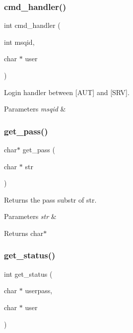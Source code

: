 \subsubsection{cmd\+\_\+handler()}
{\footnotesize\ttfamily int cmd\+\_\+handler (\begin{DoxyParamCaption}\item[{int}]{msqid,  }\item[{char $\ast$}]{user }\end{DoxyParamCaption})}



Login handler between [A\+UT] and [S\+RV]. 


\begin{DoxyParams}{Parameters}
{\em msqid} & \\
\hline
\end{DoxyParams}
\mbox{\label{auth_8c_a2e12b8307c78eca77ba679c218546ea9}} 
\subsubsection{get\+\_\+pass()}
{\footnotesize\ttfamily char$\ast$ get\+\_\+pass (\begin{DoxyParamCaption}\item[{char $\ast$}]{str }\end{DoxyParamCaption})}



Returns the pass substr of str. 


\begin{DoxyParams}{Parameters}
{\em str} & \\
\hline
\end{DoxyParams}
\begin{DoxyReturn}{Returns}
char$\ast$ 
\end{DoxyReturn}
\mbox{\label{auth_8c_afb230134b9c54844c1d46a4aff308423}} 
\subsubsection{get\+\_\+status()}
{\footnotesize\ttfamily int get\+\_\+status (\begin{DoxyParamCaption}\item[{char $\ast$}]{userpass,  }\item[{char $\ast$}]{user }\end{DoxyParamCaption})}



